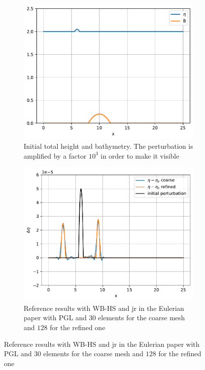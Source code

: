 \documentclass[english]{article}
\theoremstyle{thmstyleone}
\theoremstyle{thmstyletwo}
\theoremstyle{thmstylethree}
\begin{document}
\begin{figure}
	\centering
	\begin{subfigure}{0.45\textwidth}
		\includegraphics[width=\textwidth]{figures/25_LAKEATRESTNONSMOOTH.pdf}\caption{Initial total height and bathymetry. The perturbation is amplified by a factor $10^3$ in order to make it visible}
	\end{subfigure}
	\begin{subfigure}{0.45\textwidth}
		\includegraphics[width=\textwidth]{figures/31_LatRNSWBp3s14jt.pdf}\caption{Reference results with WB-HS and jr in the Eulerian paper with PGL and $30$ elements for the coarse mesh and $128$ for the refined one}

\end{subfigure}
\end{figure}
\end{document}
